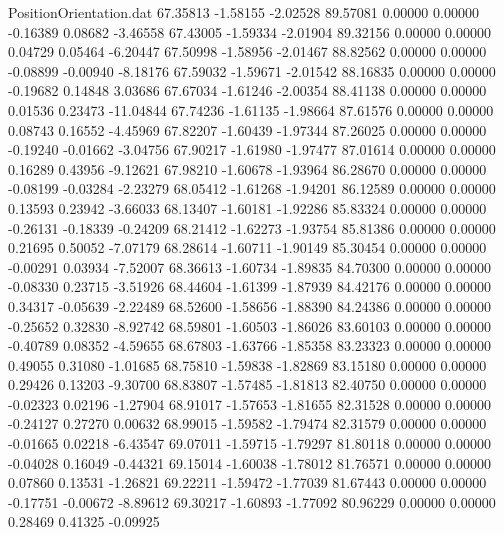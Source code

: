 \begin{filecontents}{PositionOrientation.dat}
  67.35813   -1.58155   -2.02528    89.57081    0.00000    0.00000   -0.16389    0.08682   -3.46558
  67.43005   -1.59334   -2.01904    89.32156    0.00000    0.00000    0.04729    0.05464   -6.20447
  67.50998   -1.58956   -2.01467    88.82562    0.00000    0.00000   -0.08899   -0.00940   -8.18176
  67.59032   -1.59671   -2.01542    88.16835    0.00000    0.00000   -0.19682    0.14848    3.03686
  67.67034   -1.61246   -2.00354    88.41138    0.00000    0.00000    0.01536    0.23473  -11.04844
  67.74236   -1.61135   -1.98664    87.61576    0.00000    0.00000    0.08743    0.16552   -4.45969
  67.82207   -1.60439   -1.97344    87.26025    0.00000    0.00000   -0.19240   -0.01662   -3.04756
  67.90217   -1.61980   -1.97477    87.01614    0.00000    0.00000    0.16289    0.43956   -9.12621
  67.98210   -1.60678   -1.93964    86.28670    0.00000    0.00000   -0.08199   -0.03284   -2.23279
  68.05412   -1.61268   -1.94201    86.12589    0.00000    0.00000    0.13593    0.23942   -3.66033
  68.13407   -1.60181   -1.92286    85.83324    0.00000    0.00000   -0.26131   -0.18339   -0.24209
  68.21412   -1.62273   -1.93754    85.81386    0.00000    0.00000    0.21695    0.50052   -7.07179
  68.28614   -1.60711   -1.90149    85.30454    0.00000    0.00000   -0.00291    0.03934   -7.52007
  68.36613   -1.60734   -1.89835    84.70300    0.00000    0.00000   -0.08330    0.23715   -3.51926
  68.44604   -1.61399   -1.87939    84.42176    0.00000    0.00000    0.34317   -0.05639   -2.22489
  68.52600   -1.58656   -1.88390    84.24386    0.00000    0.00000   -0.25652    0.32830   -8.92742
  68.59801   -1.60503   -1.86026    83.60103    0.00000    0.00000   -0.40789    0.08352   -4.59655
  68.67803   -1.63766   -1.85358    83.23323    0.00000    0.00000    0.49055    0.31080   -1.01685
  68.75810   -1.59838   -1.82869    83.15180    0.00000    0.00000    0.29426    0.13203   -9.30700
  68.83807   -1.57485   -1.81813    82.40750    0.00000    0.00000   -0.02323    0.02196   -1.27904
  68.91017   -1.57653   -1.81655    82.31528    0.00000    0.00000   -0.24127    0.27270    0.00632
  68.99015   -1.59582   -1.79474    82.31579    0.00000    0.00000   -0.01665    0.02218   -6.43547
  69.07011   -1.59715   -1.79297    81.80118    0.00000    0.00000   -0.04028    0.16049   -0.44321
  69.15014   -1.60038   -1.78012    81.76571    0.00000    0.00000    0.07860    0.13531   -1.26821
  69.22211   -1.59472   -1.77039    81.67443    0.00000    0.00000   -0.17751   -0.00672   -8.89612
  69.30217   -1.60893   -1.77092    80.96229    0.00000    0.00000    0.28469    0.41325   -0.09925

\end{filecontents}
